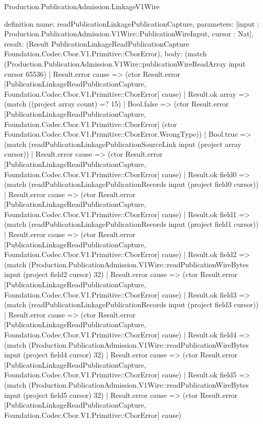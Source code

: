 \begin{lexlean}{Production.PublicationAdmission.LinkageV1Wire}
\begin{semanticmodule}
definition{
  name: readPublicationLinkagePublicationCapture,
  parameters: [input : Production.PublicationAdmission.V1Wire::PublicationWireInput, cursor : Nat],
  result: (Result PublicationLinkageReadPublicationCapture Foundation.Codec.Cbor.V1.Primitive::CborError),
  body: (match (Production.PublicationAdmission.V1Wire::publicationWireReadArray input cursor 65536)
    | Result.error cause => (ctor Result.error [PublicationLinkageReadPublicationCapture, Foundation.Codec.Cbor.V1.Primitive::CborError] cause)
    | Result.ok array => (match ((project array count) =? 15)
      | Bool.false => (ctor Result.error [PublicationLinkageReadPublicationCapture, Foundation.Codec.Cbor.V1.Primitive::CborError] (ctor Foundation.Codec.Cbor.V1.Primitive::CborError.WrongType))
      | Bool.true => (match (readPublicationLinkagePublicationSourceLink input (project array cursor))
        | Result.error cause => (ctor Result.error [PublicationLinkageReadPublicationCapture, Foundation.Codec.Cbor.V1.Primitive::CborError] cause)
        | Result.ok field0 => (match (readPublicationLinkagePublicationRecords input (project field0 cursor))
          | Result.error cause => (ctor Result.error [PublicationLinkageReadPublicationCapture, Foundation.Codec.Cbor.V1.Primitive::CborError] cause)
          | Result.ok field1 => (match (readPublicationLinkagePublicationRecords input (project field1 cursor))
            | Result.error cause => (ctor Result.error [PublicationLinkageReadPublicationCapture, Foundation.Codec.Cbor.V1.Primitive::CborError] cause)
            | Result.ok field2 => (match (Production.PublicationAdmission.V1Wire::readPublicationWireBytes input (project field2 cursor) 32)
              | Result.error cause => (ctor Result.error [PublicationLinkageReadPublicationCapture, Foundation.Codec.Cbor.V1.Primitive::CborError] cause)
              | Result.ok field3 => (match (readPublicationLinkagePublicationRecords input (project field3 cursor))
                | Result.error cause => (ctor Result.error [PublicationLinkageReadPublicationCapture, Foundation.Codec.Cbor.V1.Primitive::CborError] cause)
                | Result.ok field4 => (match (Production.PublicationAdmission.V1Wire::readPublicationWireBytes input (project field4 cursor) 32)
                  | Result.error cause => (ctor Result.error [PublicationLinkageReadPublicationCapture, Foundation.Codec.Cbor.V1.Primitive::CborError] cause)
                  | Result.ok field5 => (match (Production.PublicationAdmission.V1Wire::readPublicationWireBytes input (project field5 cursor) 32)
                    | Result.error cause => (ctor Result.error [PublicationLinkageReadPublicationCapture, Foundation.Codec.Cbor.V1.Primitive::CborError] cause)
}
\end{semanticmodule}
\end{lexlean}
